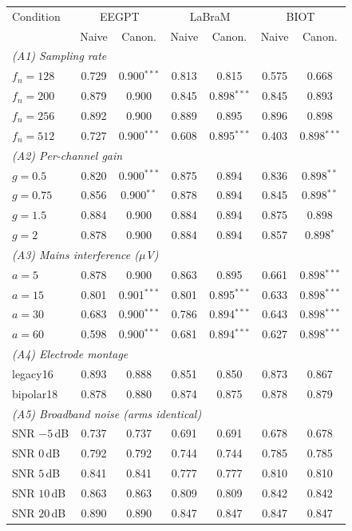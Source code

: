 \begin{tabular}{lcccccc}
\toprule
Condition & \multicolumn{2}{c}{EEGPT} & \multicolumn{2}{c}{LaBraM} & \multicolumn{2}{c}{BIOT} \\
 & Naive & Canon. & Naive & Canon. & Naive & Canon. \\
\midrule
\multicolumn{7}{l}{\emph{(A1) Sampling rate}}\\
\quad $f_n{=}128$ & 0.729 & 0.900$^{***}$ & 0.813 & 0.815 & 0.575 & 0.668 \\
\quad $f_n{=}200$ & 0.879 & 0.900 & 0.845 & 0.898$^{***}$ & 0.845 & 0.893 \\
\quad $f_n{=}256$ & 0.892 & 0.900 & 0.889 & 0.895 & 0.896 & 0.898 \\
\quad $f_n{=}512$ & 0.727 & 0.900$^{***}$ & 0.608 & 0.895$^{***}$ & 0.403 & 0.898$^{***}$ \\
\midrule
\multicolumn{7}{l}{\emph{(A2) Per-channel gain}}\\
\quad $g{=}0.5$ & 0.820 & 0.900$^{***}$ & 0.875 & 0.894 & 0.836 & 0.898$^{**}$ \\
\quad $g{=}0.75$ & 0.856 & 0.900$^{**}$ & 0.878 & 0.894 & 0.845 & 0.898$^{**}$ \\
\quad $g{=}1.5$ & 0.884 & 0.900 & 0.884 & 0.894 & 0.875 & 0.898 \\
\quad $g{=}2$ & 0.878 & 0.900 & 0.884 & 0.894 & 0.857 & 0.898$^{*}$ \\
\midrule
\multicolumn{7}{l}{\emph{(A3) Mains interference ($\mu$V)}}\\
\quad $a{=}5$ & 0.878 & 0.900 & 0.863 & 0.895 & 0.661 & 0.898$^{***}$ \\
\quad $a{=}15$ & 0.801 & 0.901$^{***}$ & 0.801 & 0.895$^{***}$ & 0.633 & 0.898$^{***}$ \\
\quad $a{=}30$ & 0.683 & 0.900$^{***}$ & 0.786 & 0.894$^{***}$ & 0.643 & 0.898$^{***}$ \\
\quad $a{=}60$ & 0.598 & 0.900$^{***}$ & 0.681 & 0.894$^{***}$ & 0.627 & 0.898$^{***}$ \\
\midrule
\multicolumn{7}{l}{\emph{(A4) Electrode montage}}\\
\quad legacy16 & 0.893 & 0.888 & 0.851 & 0.850 & 0.873 & 0.867 \\
\quad bipolar18 & 0.878 & 0.880 & 0.874 & 0.875 & 0.878 & 0.879 \\
\midrule
\multicolumn{7}{l}{\emph{(A5) Broadband noise (arms identical)}}\\
\quad SNR $-5$\,dB & 0.737 & 0.737 & 0.691 & 0.691 & 0.678 & 0.678 \\
\quad SNR $0$\,dB & 0.792 & 0.792 & 0.744 & 0.744 & 0.785 & 0.785 \\
\quad SNR $5$\,dB & 0.841 & 0.841 & 0.777 & 0.777 & 0.810 & 0.810 \\
\quad SNR $10$\,dB & 0.863 & 0.863 & 0.809 & 0.809 & 0.842 & 0.842 \\
\quad SNR $20$\,dB & 0.890 & 0.890 & 0.847 & 0.847 & 0.847 & 0.847 \\
\bottomrule
\end{tabular}

